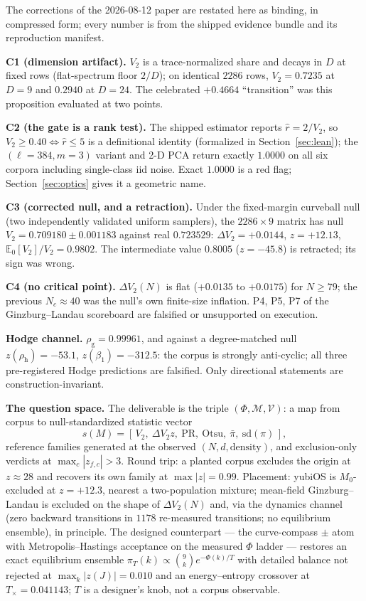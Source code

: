 \documentclass[11pt,a4paper]{article}
\theoremstyle{plain}
\theoremstyle{remark}
\begin{document}
The corrections of the 2026-08-12 paper are restated here as binding, in compressed form; every number is from the shipped evidence bundle and its reproduction manifest.

\textbf{C1 (dimension artifact).} $V_2$ is a trace-normalized share and decays in $D$ at fixed rows (flat-spectrum floor $2/D$); on identical $2286$ rows, $V_2=0.7235$ at $D=9$ and $0.2940$ at $D=24$. The celebrated $+0.4664$ ``transition'' was this proposition evaluated at two points.

\textbf{C2 (the gate is a rank test).} The shipped estimator reports $\hat r=2/V_2$, so $V_2\ge0.40\iff\hat r\le5$ is a definitional identity (formalized in Section~\ref{sec:lean}); the $(\ell{=}384,m{=}3)$ variant and 2-D PCA return exactly $1.0000$ on all six corpora including single-class iid noise. Exact $1.0000$ is a red flag; Section~\ref{sec:optics} gives it a geometric name.

\textbf{C3 (corrected null, and a retraction).} Under the fixed-margin curveball null (two independently validated uniform samplers), the $2286\times9$ matrix has null $V_2=0.709180\pm0.001183$ against real $0.723529$: $\Delta V_2=+0.0144$, $z=+12.13$, $\mathbb{E}_0[V_2]/V_2=0.9802$. The intermediate value $0.8005$ ($z=-45.8$) is retracted; its sign was wrong.

\textbf{C4 (no critical point).} $\Delta V_2(N)$ is flat ($+0.0135$ to $+0.0175$) for $N\ge79$; the previous $N_c\approx40$ was the null's own finite-size inflation. P4, P5, P7 of the Ginzburg--Landau scoreboard are falsified or unsupported on execution.

\textbf{Hodge channel.} $\rho_{\mathrm g}=0.99961$, and against a degree-matched null $z(\rho_{\mathrm h})=-53.1$, $z(\beta_1)=-312.5$: the corpus is strongly anti-cyclic; all three pre-registered Hodge predictions are falsified. Only directional statements are construction-invariant.

\textbf{The question space.} The deliverable is the triple $(\Phi,\mathcal M,\mathcal V)$: a map from corpus to null-standardized statistic vector
\begin{equation}
s(M)=[\,V_2,\ \Delta V_2z,\ \mathrm{PR},\ \mathrm{Otsu},\ \bar\pi,\ \mathrm{sd}(\pi)\,],\tag{6}
\end{equation}
reference families generated at the observed $(N,d,\text{density})$, and exclusion-only verdicts at $\max_c|z_{f,c}|>3$. Round trip: a planted corpus excludes the origin at $z\approx28$ and recovers its own family at $\max|z|=0.99$. Placement: yubiOS is $M_0$-excluded at $z=+12.3$, nearest a two-population mixture; mean-field Ginzburg--Landau is excluded on the shape of $\Delta V_2(N)$ and, via the dynamics channel (zero backward transitions in $1178$ re-measured transitions; no equilibrium ensemble), in principle. The designed counterpart --- the curve-compass $\pm$ atom with Metropolis--Hastings acceptance on the measured $\Phi$ ladder --- restores an exact equilibrium ensemble $\pi_T(k)\propto\binom9k e^{-\Phi(k)/T}$ with detailed balance not rejected at $\max_k|z(J)|=0.010$ and an energy--entropy crossover at $T_\times=0.041143$; $T$ is a designer's knob, not a corpus observable.
\end{document}
